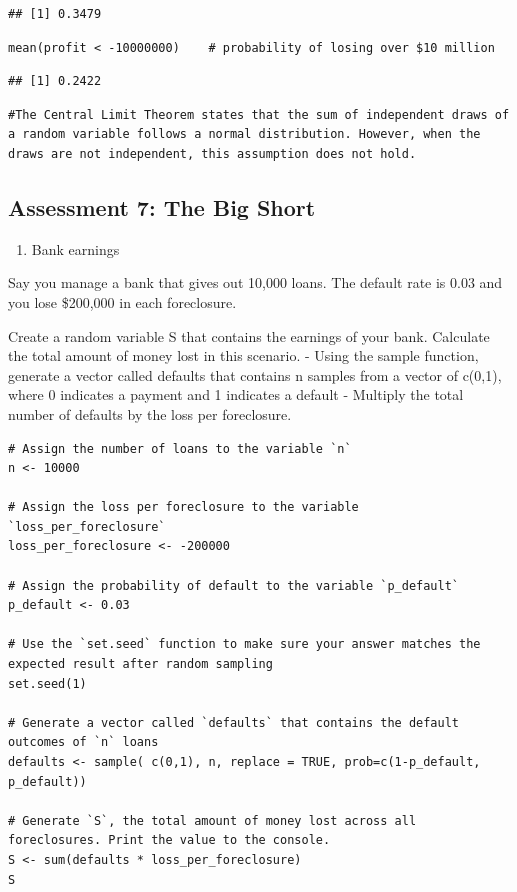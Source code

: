\documentclass[
]{article}
\providecommand{\tightlist}{%
  \setlength{\itemsep}{0pt}\setlength{\parskip}{0pt}}
\begin{document}
\begin{verbatim}
## [1] 0.3479
\end{verbatim}

\begin{verbatim}
mean(profit < -10000000)    # probability of losing over $10 million
\end{verbatim}

\begin{verbatim}
## [1] 0.2422
\end{verbatim}

\begin{verbatim}
#The Central Limit Theorem states that the sum of independent draws of a random variable follows a normal distribution. However, when the draws are not independent, this assumption does not hold.
\end{verbatim}

\hypertarget{assessment-7-the-big-short}{%
\subsection{Assessment 7: The Big
Short}\label{assessment-7-the-big-short}}

\begin{enumerate}
\def\labelenumi{\arabic{enumi}.}
\tightlist
\item
  Bank earnings
\end{enumerate}

Say you manage a bank that gives out 10,000 loans. The default rate is
0.03 and you lose \$200,000 in each foreclosure.

Create a random variable S that contains the earnings of your bank.
Calculate the total amount of money lost in this scenario. - Using the
sample function, generate a vector called defaults that contains n
samples from a vector of c(0,1), where 0 indicates a payment and 1
indicates a default - Multiply the total number of defaults by the loss
per foreclosure.

\begin{verbatim}
# Assign the number of loans to the variable `n`
n <- 10000

# Assign the loss per foreclosure to the variable `loss_per_foreclosure`
loss_per_foreclosure <- -200000

# Assign the probability of default to the variable `p_default`
p_default <- 0.03

# Use the `set.seed` function to make sure your answer matches the expected result after random sampling
set.seed(1)

# Generate a vector called `defaults` that contains the default outcomes of `n` loans
defaults <- sample( c(0,1), n, replace = TRUE, prob=c(1-p_default, p_default))

# Generate `S`, the total amount of money lost across all foreclosures. Print the value to the console.
S <- sum(defaults * loss_per_foreclosure)
S
\end{verbatim}
\end{document}
